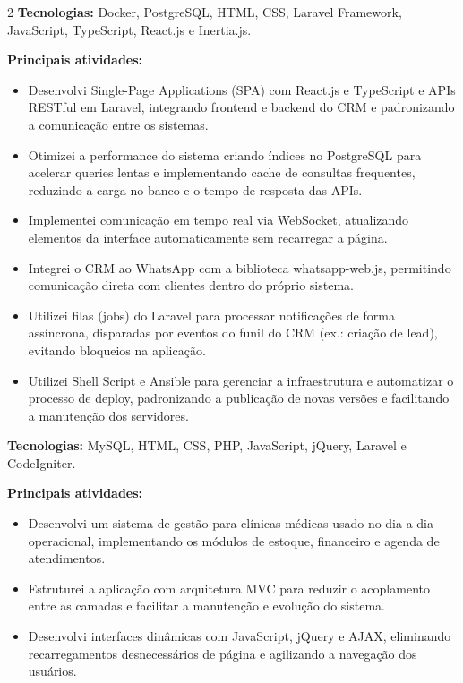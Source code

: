 \documentclass[10pt]{article}
\begin{document}
\begin{paracol}{2}
\textbf{Tecnologias:} Docker, PostgreSQL, HTML, CSS, Laravel Framework, JavaScript, TypeScript, React.js e Inertia.js.\par\vspace{4pt}
\textbf{Principais atividades:}\vspace{2pt}
\begin{itemize}
  \item Desenvolvi Single-Page Applications (SPA) com React.js e TypeScript e APIs RESTful em Laravel, integrando frontend e backend do CRM e padronizando a comunicação entre os sistemas.
  \item Otimizei a performance do sistema criando índices no PostgreSQL para acelerar queries lentas e implementando cache de consultas frequentes, reduzindo a carga no banco e o tempo de resposta das APIs.
  \item Implementei comunicação em tempo real via WebSocket, atualizando elementos da interface automaticamente sem recarregar a página.
  \item Integrei o CRM ao WhatsApp com a biblioteca whatsapp-web.js, permitindo comunicação direta com clientes dentro do próprio sistema.
  \item Utilizei filas (jobs) do Laravel para processar notificações de forma assíncrona, disparadas por eventos do funil do CRM (ex.: criação de lead), evitando bloqueios na aplicação.
  \item Utilizei Shell Script e Ansible para gerenciar a infraestrutura e automatizar o processo de deploy, padronizando a publicação de novas versões e facilitando a manutenção dos servidores.
\end{itemize}

\textbf{Tecnologias:} MySQL, HTML, CSS, PHP, JavaScript, jQuery, Laravel e CodeIgniter.\par\vspace{4pt}
\textbf{Principais atividades:}\vspace{2pt}
\begin{itemize}
  \item Desenvolvi um sistema de gestão para clínicas médicas usado no dia a dia operacional, implementando os módulos de estoque, financeiro e agenda de atendimentos.
  \item Estruturei a aplicação com arquitetura MVC para reduzir o acoplamento entre as camadas e facilitar a manutenção e evolução do sistema.
  \item Desenvolvi interfaces dinâmicas com JavaScript, jQuery e AJAX, eliminando recarregamentos desnecessários de página e agilizando a navegação dos usuários.
\end{itemize}


\end{paracol}
\end{document}
